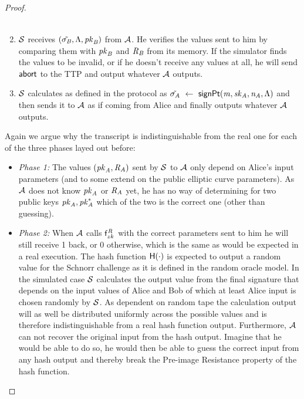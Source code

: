 \begin{proof}
\begin{enumerate}
\begin{gather*}
        \end{gather*}
        \item $\mathcal{S}$ receives $(\tilde{\sigma_{\mathit{B}}}, \Lambda, \mathit{pk}_{\mathit{B}})$ from $\mathcal{A}$.
        He verifies the values sent to him by comparing them with $\mathit{pk}_{\mathit{B}}$ and $\mathit{R}_{\mathit{B}}$ from its memory.
        If the simulator finds the values to be invalid, or if he doesn't receive any values at all, he will send $\mathsf{abort}$ to the TTP and output whatever $\mathcal{A}$ outputs.
        \item $\mathcal{S}$ calculates as defined in the protocol as $\tilde{\sigma_{\mathit{A}}} ~\leftarrow~ \mathsf{signPt}(\mathit{m}, \mathit{sk}_{\mathit{A}}, \mathit{\mathit{n}_{\mathit{A}}}, \Lambda)$ and then sends it to $\mathcal{A}$ as if coming from Alice and finally outputs whatever $\mathcal{A}$ outputs.
    \end{enumerate}
    Again we argue why the transcript is indistinguishable from the real one for each of the three phases layed out before:
    \begin{itemize}
        \item \textit{Phase 1: } The values $(\mathit{pk}_{\mathit{A}}, \mathit{R}_{\mathit{A}})$ sent by $\mathcal{S}$ to $\mathcal{A}$ only depend on Alice's input parameters (and to some extend on the public elliptic curve parameters).
        As $\mathcal{A}$ does not know $\mathit{pk}_{\mathit{A}}$ or $\mathit{R}_{\mathit{A}}$ yet, he has no way of determining for two public keys $\mathit{pk}_{\mathit{A}}, \mathit{pk}_{\mathit{A}}^*$ which of the two is the correct one (other than guessing).
        \item \textit{Phase 2: } When $\mathcal{A}$ calls $\mathsf{f}^{\mathit{R}}_{zk}$ with the correct parameters sent to him he will still receive 1 back, or 0 otherwise, which is the same as would be expected in a real execution.
        The hash function $\mathsf{H} (\cdot)$ is expected to output a random value for the Schnorr challenge as it is defined in the random oracle model.
        In the simulated case $\mathcal{S}$ calculates the output value from the final signature that depends on the input values of Alice and Bob of which at least Alice input is chosen randomly by $\mathcal{S}$.
        As dependent on random tape the calculation output will as well be distributed uniformly across the possible values and is therefore indistinguishable from a real hash function output.
        Furthermore, $\mathcal{A}$ can not recover the original input from the hash output.
        Imagine that he would be able to do so, he would then be able to guess the correct input from any hash output and thereby break the Pre-image Resistance property of the hash function.

\end{itemize}
\end{proof}

